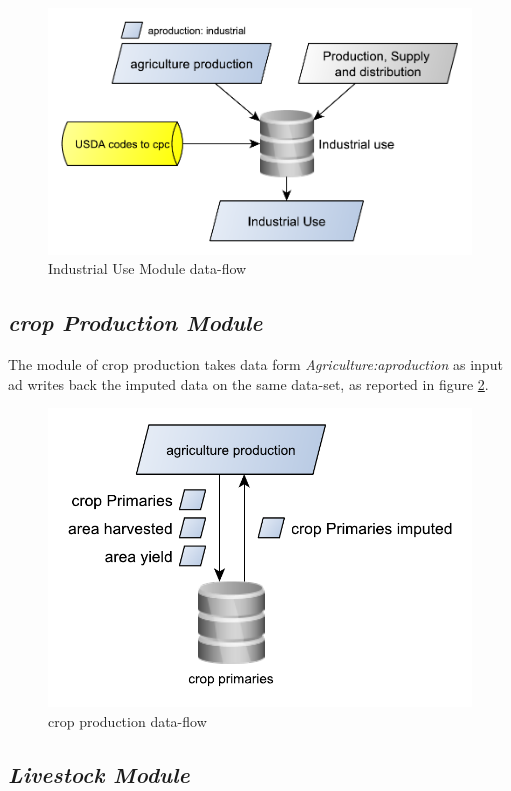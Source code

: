\documentclass[]{article}
\begin{document}
\begin{figure}[H]

{\centering \includegraphics[width=0.55\linewidth]{images/SwsFbs/05_industrialModule} 

}

\caption{\label{fig:f5}Industrial Use Module data-flow}\label{fig:f5}
\end{figure}

\subsection{\texorpdfstring{\emph{crop Production
Module}}{crop Production Module}}\label{crop-production-module}

The module of crop production takes data form
\emph{Agriculture:aproduction} as input ad writes back the imputed data
on the same data-set, as reported in figure \ref{fig:f6}.

\begin{figure}[H]

{\centering \includegraphics[width=0.5\linewidth]{images/SwsFbs/06_cropProduction} 

}

\caption{\label{fig:f6}crop production data-flow}\label{fig:f6}
\end{figure}

\subsection{\texorpdfstring{\emph{Livestock
Module}}{Livestock Module}}\label{livestock-module}
\end{document}
